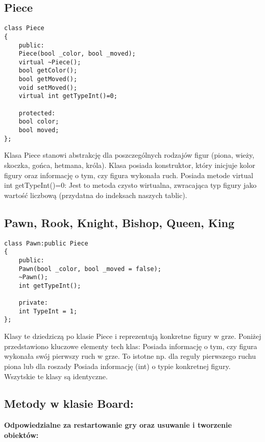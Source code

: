 \documentclass[]{report}
\begin{document}
\subsection*{Piece}

\begin{lstlisting}
class Piece
{
	public:
	Piece(bool _color, bool _moved);
	virtual ~Piece();
	bool getColor();
	bool getMoved();
	void setMoved();
	virtual int getTypeInt()=0;
	
	protected:
	bool color;
	bool moved;
};
\end{lstlisting}
\vspace{\baselineskip}
Klasa Piece stanowi abstrakcję dla poszczególnych rodzajów figur (piona, wieży, skoczka, gońca, hetmana, króla). Klasa posiada konstruktor, który inicjuje kolor figury oraz informację o tym, czy figura wykonała ruch. Posiada metode virtual int getTypeInt()=0: Jest to metoda czysto wirtualna, zwracająca typ figury jako wartość liczbową (przydatna do indeksach naszych tablic).

\subsection*{Pawn, Rook, Knight, Bishop, Queen, King}

\begin{lstlisting}
class Pawn:public Piece
{
	public:
	Pawn(bool _color, bool _moved = false);
	~Pawn();
	int getTypeInt();
	
	private:
	int TypeInt = 1;
};
\end{lstlisting}
\vspace{\baselineskip}
Klasy te dziedziczą po klasie Piece i reprezentują konkretne figury w grze. Poniżej przedstawiono kluczowe elementy tech klas: Posiada informację o tym, czy figura wykonała swój pierwszy ruch w grze. To istotne np. dla reguły pierwszego ruchu piona lub dla roszady Posiada informację (int) o typie konkretnej figury. Wszytskie te klasy są identyczne.

\subsection*{Metody w klasie Board:}

\textbf{Odpowiedzialne za restartowanie gry oraz usuwanie i tworzenie obiektów:}
\end{document}
